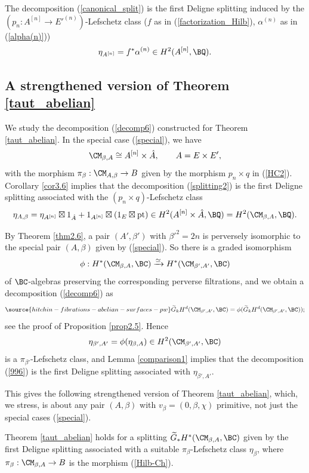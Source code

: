 \begin{cor}
\notready\label{cor3.6}
The decomposition (\ref{canonical_split}) is the first Deligne splitting induced by the
$(p_n: A^{[n]} \to E'^{(n)})$-Lefschetz class  ($f$ as in (\ref{factorization_Hilb}), $\alpha^{(n)}$
as in (\ref{alpha(n)}))
\[
\eta_{A^{[n]}} = f^*\alpha^{(n)} \in H^2(A^{[n]}, \BQ).
\]
\end{cor}

\subsection{A strengthened version of Theorem \ref{taut_abelian}}\label{Section3.5}
We study the decomposition (\ref{decomp6}) constructed for Theorem \ref{taut_abelian}. In the special case (\ref{special}), we have
\[
\CM_{\beta, A} \cong A^{[n]} \times \hat{A}, \qquad A=E \times E',
\]
with the morphism $\pi_\beta: \CM_{A,\beta} \to B$ given by the morphism $p_n\times q$ in (\ref{HC2}). Corollary \ref{cor3.6}
implies that the decomposition (\ref{splitting2}) is the first Deligne splitting associated with the
$(p_n\times q)$-Lefschetz class
\[
\eta_{A,\beta} = \eta_{A^{[n]}} \boxtimes 1_{\hat{A}} + 1_{A^{[n]}}\boxtimes \left(1_E \boxtimes \mathrm{pt} \right) \in H^2(A^{[n]} \times \hat{A}, \BQ) =  H^2(\CM_{\beta, A}, \BQ).
\]

By Theorem \ref{thm2.6}, a pair $(A', \beta')$ with $\beta'^2=2n$ is perversely isomorphic to the special pair $(A, \beta)$ given by (\ref{special}). So there is a graded isomorphism
\[
\phi: H^*(\CM_{\beta, A}, \BC) \xrightarrow{\simeq} H^*(\CM_{\beta', A'}, \BC)
\]
of $\BC$-algebras preserving the corresponding perverse filtrations, and we obtain a decomposition (\ref{decomp6}) as
\begin{equation}\label{996}
\source{hitchin-fibrations-abelian-surfaces-pw}
\widetilde{G}_kH^d(\CM_{\beta',A'}, \BC) = \phi(\widetilde{G}_kH^d(\CM_{\beta',A'}, \BC));
\end{equation}
see the proof of Proposition \ref{prop2.5}. Hence
\[
\eta_{\beta',A'} = \phi(\eta_{\beta,A}) \in H^2(\CM_{\beta',A'}, \BC)
\]
is a $\pi_{\beta'}$-Lefschetz class, and Lemma \ref{comparison1} implies that the decomposition (\ref{996}) is the first Deligne splitting associated with $\eta_{\beta',A'}$.

This gives the following strengthened version of Theorem \ref{taut_abelian}, which, we stress, is about any pair $(A,  \beta)$ with $v_\beta = (0, \beta, \chi)$ primitive, not just the special cases (\ref{special}).

\begin{thm}
\notready\label{strengthened2.1}
Theorem \ref{taut_abelian} holds for a splitting $\widetilde{G}_\ast H^\ast(\CM_{\beta,A}, \BC)$ given by the first Deligne splitting associated with a {suitable $\pi_\beta$-Lefschetz class $\eta_\beta$}, where $\pi_\beta: \CM_{\beta,A} \to B$  is the morphism (\ref{Hilb-Ch}).
\end{thm}
